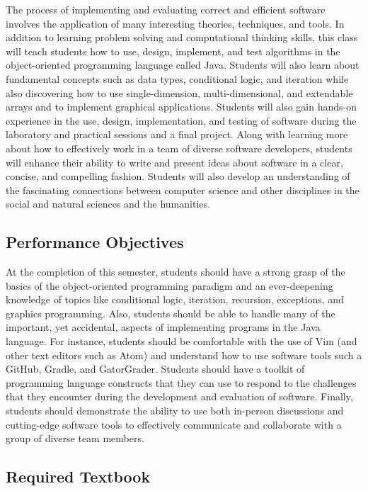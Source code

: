 \documentclass[11pt]{article}
\begin{document}
The process of implementing and evaluating correct and efficient software
involves the application of many interesting theories, techniques, and tools. In
addition to learning problem solving and computational thinking skills, this
class will teach students how to use, design, implement, and test algorithms in
the object-oriented programming language called Java. Students will also learn
about fundamental concepts such as data types, conditional logic, and iteration
while also discovering how to use single-dimension, multi-dimensional, and
extendable arrays and to implement graphical applications. Students will also
gain hands-on experience in the use, design, implementation, and testing of
software during the laboratory and practical sessions and a final project. Along
with learning more about how to effectively work in a team of diverse software
developers, students will enhance their ability to write and present ideas about
software in a clear, concise, and compelling fashion. Students will also develop
an understanding of the fascinating connections between computer science and
other disciplines in the social and natural sciences and the humanities.

\subsection*{Performance Objectives}

At the completion of this semester, students should have a strong grasp of the
basics of the object-oriented programming paradigm and an ever-deepening
knowledge of topics like conditional logic, iteration, recursion, exceptions,
and graphics programming. Also, students should be able to handle many of the
important, yet accidental, aspects of implementing programs in the Java
language. For instance, students should be comfortable with the use of Vim (and
other text editors such as Atom) and understand how to use software tools such a
GitHub, Gradle, and GatorGrader. Students should have a toolkit of programming
language constructs that they can use to respond to the challenges that they
encounter during the development and evaluation of software. Finally, students
should demonstrate the ability to use both in-person discussions and
cutting-edge software tools to effectively communicate and collaborate with a
group of diverse team members.

\vspace*{-.05in}

\subsection*{Required Textbook}
\end{document}
